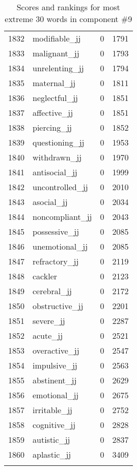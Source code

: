 \begin{longtable}[!htbp]{| rlr@{.}l |}
    1832 & modifiable\_jj & 0 & 1791 \\
    1833 & malignant\_jj & 0 & 1793 \\
    1834 & unrelenting\_jj & 0 & 1794 \\
    1835 & maternal\_jj & 0 & 1811 \\
    1836 & neglectful\_jj & 0 & 1851 \\
    1837 & affective\_jj & 0 & 1851 \\
    1838 & piercing\_jj & 0 & 1852 \\
    1839 & questioning\_jj & 0 & 1953 \\
    1840 & withdrawn\_jj & 0 & 1970 \\
    1841 & antisocial\_jj & 0 & 1999 \\
    1842 & uncontrolled\_jj & 0 & 2010 \\
    1843 & asocial\_jj & 0 & 2034 \\
    1844 & noncompliant\_jj & 0 & 2043 \\
    1845 & possessive\_jj & 0 & 2085 \\
    1846 & unemotional\_jj & 0 & 2085 \\
    1847 & refractory\_jj & 0 & 2119 \\
    1848 & cackler & 0 & 2123 \\
    1849 & cerebral\_jj & 0 & 2172 \\
    1850 & obstructive\_jj & 0 & 2201 \\
    1851 & severe\_jj & 0 & 2287 \\
    1852 & acute\_jj & 0 & 2521 \\
    1853 & overactive\_jj & 0 & 2547 \\
    1854 & impulsive\_jj & 0 & 2563 \\
    1855 & abstinent\_jj & 0 & 2629 \\
    1856 & emotional\_jj & 0 & 2675 \\
    1857 & irritable\_jj & 0 & 2752 \\
    1858 & cognitive\_jj & 0 & 2828 \\
    1859 & autistic\_jj & 0 & 2837 \\
    1860 & aplastic\_jj & 0 & 3409 \\
    \hline
    \caption{Scores and rankings for most extreme 30 words in component \#9} \\
\end{longtable}
